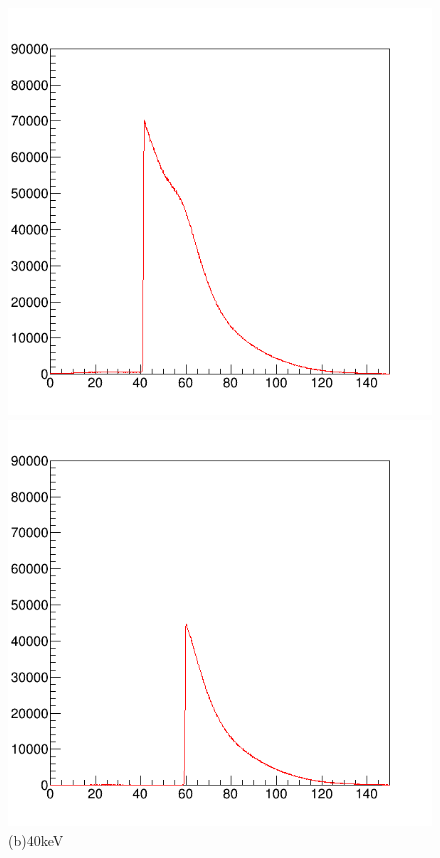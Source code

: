 \begin{figure}[H]
\begin{minipage}{0.52\hsize}
\begin{center}
    \includegraphics[bb=0.000000 0.000000 596.000000 574.000000,width=1.0\hsize]{image2/chapter5/120kV_0.1mA_40keV_100sec.png}
  \end{center}  
\vspace{-1cm}
\caption*{(b)40keV}
 \end{minipage}
   \begin{minipage}{0.5\hsize}
  \begin{center}
       \includegraphics[bb=0.000000 0.000000 596.000000 574.000000,width=1.0\hsize]{image2/chapter5/120kV_0.1mA_60keV_100sec.png}

\end{center}
\end{minipage}
\end{figure}
